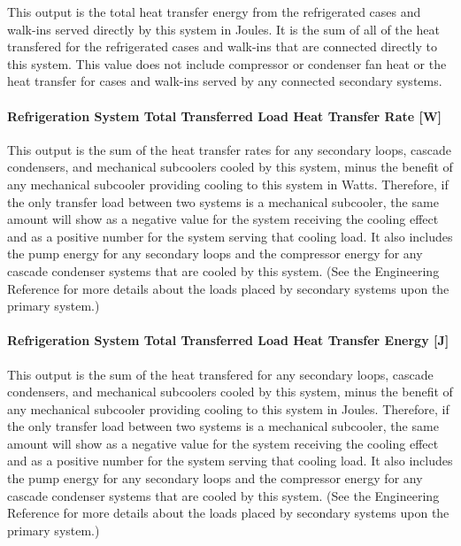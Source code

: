 This output is the total heat transfer energy from the refrigerated cases and walk-ins served directly by this system in Joules. It is the sum of all of the heat transfered for the refrigerated cases and walk-ins that are connected directly to this system. This value does not include compressor or condenser fan heat or the heat transfer for cases and walk-ins served by any connected secondary systems.

\paragraph{Refrigeration System Total Transferred Load Heat Transfer Rate {[}W{]}}\label{refrigeration-system-total-transferred-load-heat-transfer-rate-w}

This output is the sum of the heat transfer rates for any secondary loops, cascade condensers, and mechanical subcoolers cooled by this system, minus the benefit of any mechanical subcooler providing cooling to this system in Watts. Therefore, if the only transfer load between two systems is a mechanical subcooler, the same amount will show as a negative value for the system receiving the cooling effect and as a positive number for the system serving that cooling load. It also includes the pump energy for any secondary loops and the compressor energy for any cascade condenser systems that are cooled by this system. (See the Engineering Reference for more details about the loads placed by secondary systems upon the primary system.)

\paragraph{Refrigeration System Total Transferred Load Heat Transfer Energy {[}J{]}}\label{refrigeration-system-total-transferred-load-heat-transfer-energy-j}

This output is the sum of the heat transfered for any secondary loops, cascade condensers, and mechanical subcoolers cooled by this system, minus the benefit of any mechanical subcooler providing cooling to this system in Joules. Therefore, if the only transfer load between two systems is a mechanical subcooler, the same amount will show as a negative value for the system receiving the cooling effect and as a positive number for the system serving that cooling load. It also includes the pump energy for any secondary loops and the compressor energy for any cascade condenser systems that are cooled by this system. (See the Engineering Reference for more details about the loads placed by secondary systems upon the primary system.)

